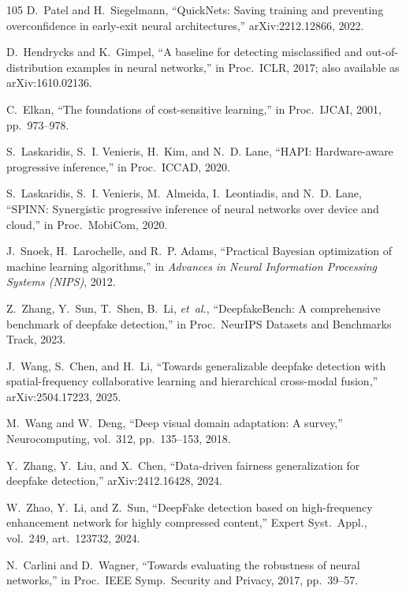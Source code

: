 \begin{thebibliography}{105}
D.~Patel and H.~Siegelmann, ``QuickNets: Saving training and preventing overconfidence in early-exit neural architectures,'' arXiv:2212.12866, 2022.

D.~Hendrycks and K.~Gimpel, ``A baseline for detecting misclassified and out-of-distribution examples in neural networks,'' in Proc.\ ICLR, 2017; also available as arXiv:1610.02136.

C.~Elkan, ``The foundations of cost-sensitive learning,'' in Proc.\ IJCAI, 2001, pp.~973--978.

S.~Laskaridis, S.~I. Venieris, H.~Kim, and N.~D. Lane, ``HAPI: Hardware-aware progressive inference,'' in Proc.\ ICCAD, 2020.

S.~Laskaridis, S.~I. Venieris, M.~Almeida, I.~Leontiadis, and N.~D. Lane, ``SPINN: Synergistic progressive inference of neural networks over device and cloud,'' in Proc.\ MobiCom, 2020.

J.~Snoek, H.~Larochelle, and R.~P. Adams, ``Practical Bayesian optimization of machine learning algorithms,'' in \emph{Advances in Neural Information Processing Systems (NIPS)}, 2012.

Z.~Zhang, Y.~Sun, T.~Shen, B.~Li, \emph{et~al.}, ``DeepfakeBench: A comprehensive benchmark of deepfake detection,'' in Proc.\ NeurIPS Datasets and Benchmarks Track, 2023.

J.~Wang, S.~Chen, and H.~Li, ``Towards generalizable deepfake detection with spatial-frequency collaborative learning and hierarchical cross-modal fusion,'' arXiv:2504.17223, 2025.

M.~Wang and W.~Deng, ``Deep visual domain adaptation: A survey,'' Neurocomputing, vol.~312, pp.~135--153, 2018.

Y.~Zhang, Y.~Liu, and X.~Chen, ``Data-driven fairness generalization for deepfake detection,'' arXiv:2412.16428, 2024.

W.~Zhao, Y.~Li, and Z.~Sun, ``DeepFake detection based on high-frequency enhancement network for highly compressed content,'' Expert Syst.\ Appl., vol.~249, art.~123732, 2024.

N.~Carlini and D.~Wagner, ``Towards evaluating the robustness of neural networks,'' in Proc.\ IEEE Symp.\ Security and Privacy, 2017, pp.~39--57.


\end{thebibliography}

